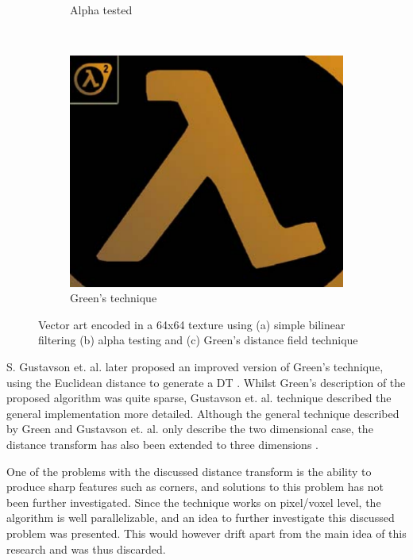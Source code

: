 \begin{figure}[!h]
\begin{subfigure}[b]{0.3\textwidth}
        \caption{Alpha tested}
        \label{fig:valveA}
    \end{subfigure}
    ~ 
    \begin{subfigure}[b]{0.3\textwidth}
        \includegraphics[width=\textwidth]{Theory/Figs/ValveGreensTechnique.png}
        \caption{Green's technique}
        \label{fig:valveC}
    \end{subfigure}
    \caption{Vector art encoded in a 64x64 texture using (a) simple bilinear filtering (b) alpha testing and (c) Green's distance field technique}
    \label{fig:GreensDT}
\end{figure}

S. Gustavson et. al. later proposed an improved version of Green's technique, using the Euclidean distance to generate a DT \cite{gustavson2011anti}. Whilst Green's description of the proposed algorithm was quite sparse, Gustavson et. al. technique described the general implementation more detailed. Although the general technique described by Green and Gustavson et. al. only describe the two dimensional case, the distance transform has also been extended to three dimensions \cite{jones20063d}. 

One of the problems with the discussed distance transform is the ability to produce sharp features such as corners, and solutions to this problem has not been further investigated. Since the technique works on pixel/voxel level, the algorithm is well parallelizable, and an idea to further investigate this discussed problem was presented. This would however drift apart from the main idea of this research and was thus discarded.

